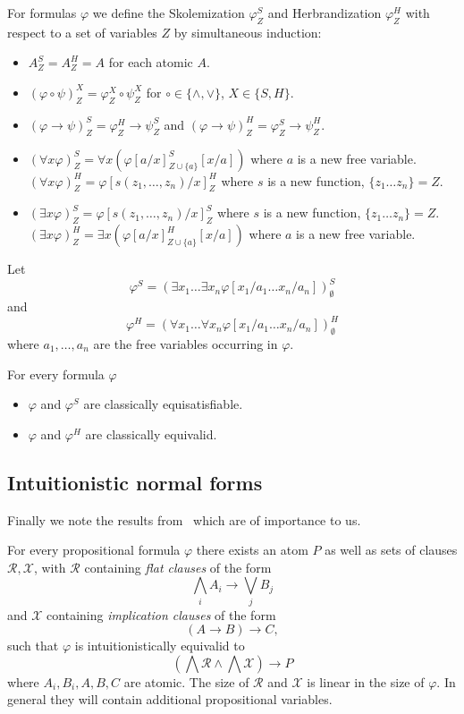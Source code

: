 \documentclass[runningheads]{llncs}
\begin{document}
\begin{definition}
	For formulas $\varphi$ we define the Skolemization $\varphi^S_Z$ and Herbrandization $\varphi^H_Z$ with respect to a set of variables $Z$ by simultaneous induction:
	\begin{itemize}
		\item $A^S_Z = A^H_Z = A$ for each atomic $A$.
		\item $(\varphi\circ\psi)^X_Z = \varphi^X_Z\circ\psi^X_Z$ for $\circ\in\{\wedge, \vee\}$, $X\in\{S, H\}$.
		\item $(\varphi\to\psi)^S_Z = \varphi^H_Z\to \psi^S_Z$ and $(\varphi\to\psi)^H_Z = \varphi^S_Z\to\psi^H_Z$.
		\item $(\forall x\varphi)^S_Z = \forall x(\varphi[a/x]^S_{Z\cup\{a\}}[x/a])$ where $a$ is a new free variable.\\$(\forall x\varphi)^H_Z = \varphi[s(z_1,\dots,z_n)/x]^H_Z$ where $s$ is a new function, $\{z_1\dots z_n\} = Z$.
		\item $(\exists x\varphi)^S_Z = \varphi[s(z_1,\dots,z_n)/x]^S_Z$ where $s$ is a new function, $\{z_1\dots z_n\} = Z$.\\$(\exists x\varphi)^H_Z = \exists x(\varphi[a/x]^H_{Z\cup\{a\}}[x/a])$ where $a$ is a new free variable.
	\end{itemize}
	Let $$\varphi^S = (\exists x_1\dots\exists x_n \varphi[x_1/a_1\dots x_n/a_n])^S_\emptyset$$ and $$\varphi^H = (\forall x_1\dots\forall x_n \varphi[x_1/a_1\dots x_n/a_n])^H_\emptyset$$ where $a_1,\dots,a_n$ are the free variables occurring in $\varphi$.
\end{definition}

\begin{theorem}
	\label{thm:herbrand-skolem}
	For every formula $\varphi$
	\begin{itemize}
		\item $\varphi$ and $\varphi^S$ are classically equisatisfiable.
		\item $\varphi$ and $\varphi^H$ are classically equivalid.
	\end{itemize}
\end{theorem}


\subsection{Intuitionistic normal forms}

Finally we note the results from~\cite{otten2005clausal} which are of importance to us.

\begin{lemma}\label{lemma:propositional-normal-form}
	For every propositional formula $\varphi$ there exists an atom $P$ as well as sets of clauses $\mathcal R, \mathcal X$, with $\mathcal R$ containing  \emph{flat clauses} of the form
	$$\bigwedge_iA_i\to\bigvee_jB_j$$
	and $\mathcal X$ containing \emph{implication clauses} of the form
	$$(A\to B)\to C,$$
	such that $\varphi$ is intuitionistically equivalid to
	$$\left(\bigwedge\mathcal R\wedge\bigwedge\mathcal X\right)\to P$$where $A_i, B_i, A, B, C$ are atomic. The size of $\mathcal R$ and $\mathcal X$ is linear in the size of $\varphi$. In general they will contain additional propositional variables.
\end{lemma}
\end{document}
